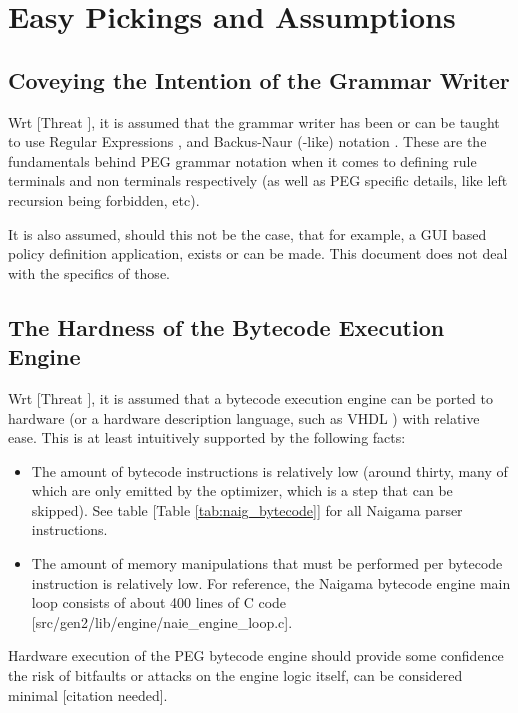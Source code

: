 \section{Easy Pickings and Assumptions}

\subsection{Coveying the Intention of the Grammar Writer}

Wrt [Threat \thethreatintent], it is assumed that the grammar writer has been
or can be taught to use Regular Expressions \cite{bib:regex}, and
Backus-Naur (-like) notation \cite{bib:backusnaur}. These are the fundamentals
behind PEG grammar notation when it comes to defining rule terminals and
non terminals respectively (as well as PEG specific details, like left
recursion being forbidden, etc).

It is also assumed, should this not be the case, that for example, a GUI
based policy definition application, exists or can be made. This document
does not deal with the specifics of those.

\subsection{The Hardness of the Bytecode Execution Engine}

Wrt [Threat \thethreatengine], it is assumed that a bytecode execution
engine can be ported to hardware (or a hardware description language, such
as VHDL \cite{bib:vhdl})  with relative ease. This is at least
intuitively supported by the following facts:

\begin{itemize}
\item The amount of bytecode instructions is relatively low (around thirty,
      many of which are only emitted by the optimizer, which is a step
      that can be skipped). See table [Table \ref{tab:naig_bytecode}]
      for all Naigama parser instructions.
\item The amount of memory manipulations that must be performed per
      bytecode instruction is relatively low. For reference, the Naigama
      bytecode engine main loop consists of about 400 lines of C code
      [src/gen2/lib/engine/naie\_engine\_loop.c].
\end{itemize}

Hardware execution of the PEG bytecode engine should provide some
confidence the risk of bitfaults or attacks on the engine logic itself, can
be considered minimal [citation needed].
